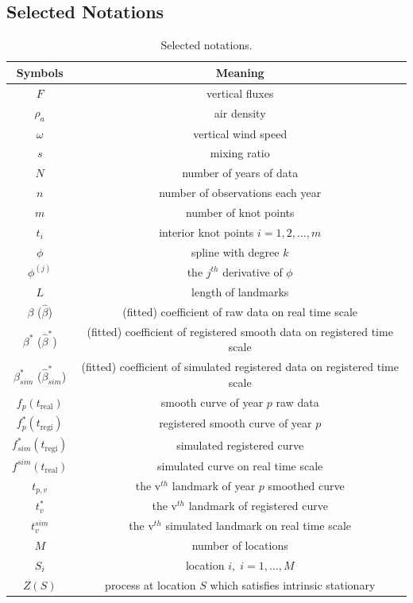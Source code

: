 \documentclass{article}
\begin{document}
\clearpage

\begin{appendices}

\section{Selected Notations}

\begin{table}[!ht]
\caption{Selected notations.}\label{Tab:all_symbols}
\centering
\def\arraystretch{1.5}
\begin{tabular}{cc}
\textbf{Symbols} & \textbf{Meaning} \\
\hline\hline
$F$ & vertical fluxes \\
$\rho_a$ & air density\\
$\omega$  & vertical wind speed\\ 
$s$ & mixing ratio\\
\hline \hline
$N$ & number of years of data\\
$n$ & number of observations each year \\
$m$ & number of knot points\\
$t_i$ & interior knot points $i = 1,2,\dots,m$ \\ 
$\phi$ & spline with degree $k$ \\
$\phi^{(j)}$ & the $j^{th}$ derivative of $\phi$ \\
$L$ & length of landmarks\\ 
\hline
$\beta$ ($\widehat{\beta}$) & (fitted) coefficient of raw data on real time scale\\
$\beta^*$ ($\widehat{\beta}^*$) & (fitted) coefficient of registered smooth data on registered time scale\\
$\beta^*_{sim}$ ($\widehat{\beta}^*_{sim}$) & (fitted) coefficient of simulated registered data on registered time scale\\ 
\hline
$f_p(t_{\textrm{real}})$ &  smooth curve of year $p$ raw data\\
$f^*_p(t_{\textrm{regi}})$ & registered smooth curve of year $p$ \\
$f_{sim}^*(t_{\textrm{regi}})$ & simulated registered curve\\
$f^{sim}(t_{\textrm{real}})$ & simulated curve on real time scale\\
\hline
$t_{p,v}$ & the v$^{th}$ landmark of year $p$ smoothed curve \\
$t_v^*$ & the v$^{th}$ landmark of registered curve\\
$t_v^{sim}$ & the v$^{th}$ simulated landmark on real time scale\\
\hline\hline
$M$ & number of locations\\
$S_i$ & location $i,\;i=1,\dots,M$\\
$Z(S)$ & process at location $S$ which satisfies intrinsic stationary\\ 
\hline \hline
\end{tabular}
\end{table}


\end{appendices}
\end{document}
